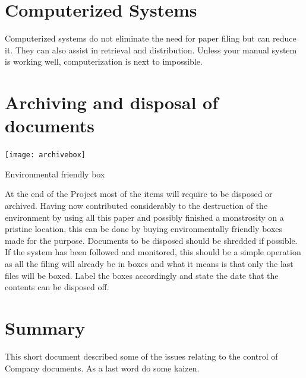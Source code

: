 \section*{Computerized Systems}

Computerized systems do not eliminate the need for paper filing but can reduce it. They can also assist in retrieval and distribution. Unless
your manual system is working well, computerization is next to impossible.


\section*{Archiving and disposal of documents}
\begin{marginfigure}
  \texttt{[image: archivebox]}
  \caption{Environmental friendly box}
  \label{fig:marginfig1}
\end{marginfigure}
At the end of the Project most of the items will require to be disposed or archived. Having now contributed considerably to the destruction of the environment by using all this paper and possibly finished a monstrosity on a pristine location, this can be done by buying environmentally friendly boxes made for the purpose. Documents to be disposed should be shredded if possible. If the system has been followed and monitored, this should be a simple operation as all the filing will already be in boxes and what it means is that only the last files will be boxed. Label the boxes accordingly and state the date that the contents can be disposed off.

\section*{Summary}

This short document described some of the issues relating to the control of Company documents. As a last word do some kaizen.


























